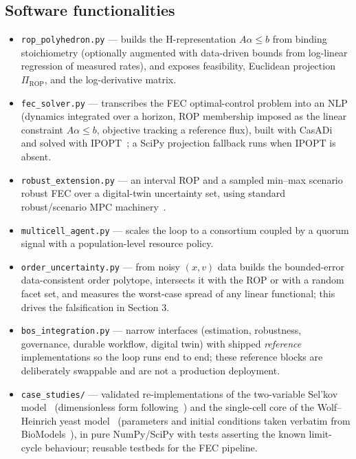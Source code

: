 \documentclass[11pt]{article}
\newcommand{\rop}{\mathrm{ROP}}
\begin{document}
\subsection{Software functionalities}
\begin{itemize}\setlength\itemsep{1pt}
\item \texttt{rop\_polyhedron.py} --- builds the H-representation $A\alpha\le b$ from binding
stoichiometry (optionally augmented with data-driven bounds from log-linear regression of
measured rates), and exposes feasibility, Euclidean projection $\Pi_{\rop}$, and the
log-derivative matrix.
\item \texttt{fec\_solver.py} --- transcribes the FEC optimal-control problem into an NLP
(dynamics integrated over a horizon, ROP membership imposed as the linear constraint
$A\alpha\le b$, objective tracking a reference flux), built with
CasADi~\citep{andersson2019casadi} and solved with IPOPT~\citep{wachter2006ipopt}; a SciPy
projection fallback runs when IPOPT is absent.
\item \texttt{robust\_extension.py} --- an interval ROP and a sampled min--max scenario robust
FEC over a digital-twin uncertainty set, using standard robust/scenario MPC
machinery~\citep{kothare1996robust,scokaert1998minmax,mayne2005tube,calafiore2006scenario,campi2008exact,bertsimas2011robust}.
\item \texttt{multicell\_agent.py} --- scales the loop to a consortium coupled by a quorum
signal with a population-level resource policy.
\item \texttt{order\_uncertainty.py} --- from noisy $(x,v)$ data builds the bounded-error
data-consistent order polytope, intersects it with the ROP or with a random facet set, and
measures the worst-case spread of any linear functional; this drives the falsification in
Section 3.
\item \texttt{bos\_integration.py} --- narrow interfaces (estimation, robustness, governance,
durable workflow, digital twin) with shipped \emph{reference} implementations so the loop
runs end to end; these reference blocks are deliberately swappable and are not a production deployment.
\item \texttt{case\_studies/} --- validated re-implementations of the two-variable Sel'kov
model~\citep{selkov1968} (dimensionless form following~\citep{strogatz2014nonlinear}) and the
single-cell core of the Wolf--Heinrich yeast model~\citep{wolf2000} (parameters and initial
conditions taken verbatim from BioModels~\citep{biomd691}), in pure NumPy/SciPy with tests asserting the known limit-cycle
behaviour; reusable testbeds for the FEC pipeline.
\end{itemize}
\end{document}
